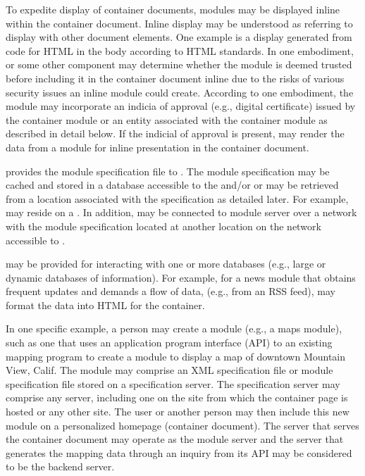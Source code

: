 To expedite display
of container documents, modules may be displayed inline within the
container document. Inline display may be understood as referring to
display with other document elements. One example is a display
generated from code for HTML in the body according to HTML
standards. In one embodiment, \moduleserver{} or some other
component may determine whether the module is deemed trusted before
including it in the container document inline due to the risks of
various security issues an inline module could create. According to
one embodiment, the module may incorporate an indicia of approval
(e.g., digital certificate) issued by the container module or an
entity associated with the container module as described in detail
below. If the indicial of approval is present, \moduleserver{}
may render the data from a module for inline presentation in the
container document.


\Specificationserver{}
provides the module specification file to \moduleserver{}. The module specification may be cached and stored in a
database accessible to the \moduleserver{} and/or
\specificationserver{} or may be retrieved from a location
associated with the specification as detailed later. For example,
\specificationserver{} may reside on a \remotesourcesystem. In addition, \specificationserver{} may be
connected to module server over a network with the module
specification located at another location on the network accessible to
\specificationserver{}.


\Backendserver{} may be provided for interacting with one or more
databases (e.g., large or dynamic databases of information). For
example, for a news module that obtains frequent updates and demands a
flow of data, (e.g., from an RSS feed), \backendserver{} may
format the data into HTML for the container.



In one specific example, a person may create a module
(e.g., a maps module), such as one that uses an application program
interface (API) to an existing mapping program to create a module to
display a map of downtown Mountain View, Calif. The module may
comprise an XML specification file or module specification file stored
on a specification server. The specification server may comprise any
server, including one on the site from which the container page is
hosted or any other site. The user or another person may then include
this new module on a personalized homepage (container document). The
server that serves the container document may operate as the module
server and the server that generates the mapping data through an
inquiry from its API may be considered to be the backend server.



